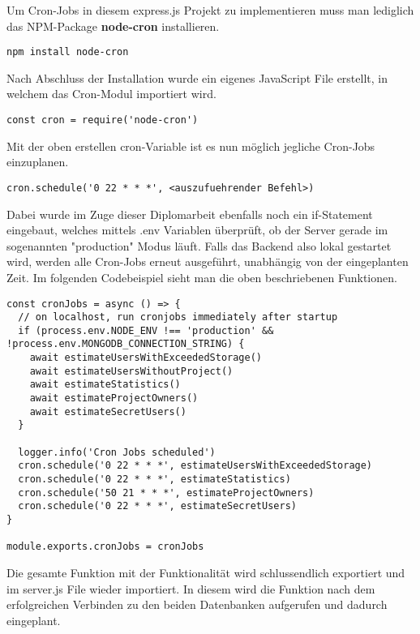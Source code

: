 Um Cron-Jobs in diesem express.js Projekt zu implementieren muss man lediglich das NPM-Package \textbf{node-cron} installieren.
\begin{verbatim}
npm install node-cron
\end{verbatim}
Nach Abschluss der Installation wurde ein eigenes JavaScript File erstellt, in welchem das Cron-Modul importiert wird.
\begin{verbatim}
const cron = require('node-cron')
\end{verbatim}
Mit der oben erstellen cron-Variable ist es nun möglich jegliche Cron-Jobs einzuplanen.
\newline
\begin{lstlisting}
cron.schedule('0 22 * * *', <auszufuehrender Befehl>)
\end{lstlisting}
Dabei wurde im Zuge dieser Diplomarbeit ebenfalls noch ein if-Statement eingebaut, welches mittels .env Variablen überprüft, ob der Server gerade im sogenannten "production" Modus läuft. Falls das Backend also lokal gestartet wird, werden alle Cron-Jobs erneut ausgeführt, unabhängig von der eingeplanten Zeit. Im folgenden Codebeispiel sieht man die oben beschriebenen Funktionen.
\newline
\begin{lstlisting}
const cronJobs = async () => {
  // on localhost, run cronjobs immediately after startup
  if (process.env.NODE_ENV !== 'production' && !process.env.MONGODB_CONNECTION_STRING) {
    await estimateUsersWithExceededStorage()
    await estimateUsersWithoutProject()
    await estimateStatistics()
    await estimateProjectOwners()
    await estimateSecretUsers()
  }

  logger.info('Cron Jobs scheduled')
  cron.schedule('0 22 * * *', estimateUsersWithExceededStorage)
  cron.schedule('0 22 * * *', estimateStatistics)
  cron.schedule('50 21 * * *', estimateProjectOwners)
  cron.schedule('0 22 * * *', estimateSecretUsers)
}

module.exports.cronJobs = cronJobs
\end{lstlisting}
Die gesamte Funktion mit der Funktionalität wird schlussendlich exportiert und im server.js File wieder importiert. In diesem wird die Funktion nach dem erfolgreichen Verbinden zu den beiden Datenbanken aufgerufen und dadurch eingeplant.
